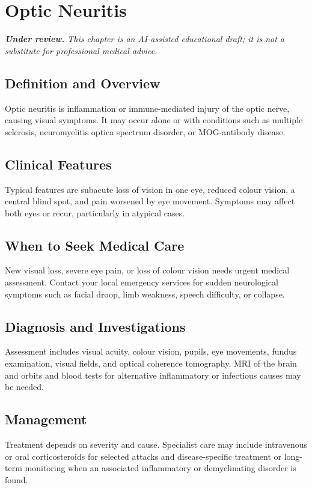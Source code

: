 \chapter{Optic Neuritis}

\medskip
\noindent\textit{\textbf{Under review.} This chapter is an AI-assisted educational draft; it is not a substitute for professional medical advice.}

\section*{Definition and Overview}
Optic neuritis is inflammation or immune-mediated injury of the optic nerve, causing visual symptoms. It may occur alone or with conditions such as multiple sclerosis, neuromyelitis optica spectrum disorder, or MOG-antibody disease.

\section*{Clinical Features}
Typical features are subacute loss of vision in one eye, reduced colour vision, a central blind spot, and pain worsened by eye movement. Symptoms may affect both eyes or recur, particularly in atypical cases.

\section*{When to Seek Medical Care}
New visual loss, severe eye pain, or loss of colour vision needs urgent medical assessment. Contact your local emergency services for sudden neurological symptoms such as facial droop, limb weakness, speech difficulty, or collapse.

\section*{Diagnosis and Investigations}
Assessment includes visual acuity, colour vision, pupils, eye movements, fundus examination, visual fields, and optical coherence tomography. MRI of the brain and orbits and blood tests for alternative inflammatory or infectious causes may be needed.

\section*{Management}
Treatment depends on severity and cause. Specialist care may include intravenous or oral corticosteroids for selected attacks and disease-specific treatment or long-term monitoring when an associated inflammatory or demyelinating disorder is found.


